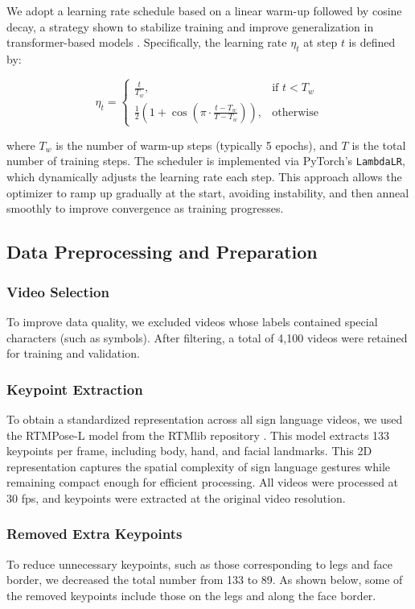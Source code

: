 \documentclass[runningheads]{llncs}
\begin{document}
We adopt a learning rate schedule based on a linear warm-up followed by cosine decay, a strategy shown to stabilize training and improve generalization in transformer-based models \cite{vaswani2023attentionneed, loshchilov2017sgdr}. Specifically, the learning rate \(\eta_t\) at step \(t\) is defined by:

\[
\eta_t = 
\begin{cases}
\frac{t}{T_w}, & \text{if } t < T_w \\
\frac{1}{2} \left(1 + \cos\left( \pi \cdot \frac{t - T_w}{T - T_w} \right) \right), & \text{otherwise}
\end{cases}
\]

where \(T_w\) is the number of warm-up steps (typically 5 epochs), and \(T\) is the total number of training steps. The scheduler is implemented via PyTorch’s \texttt{LambdaLR}, which dynamically adjusts the learning rate each step. This approach allows the optimizer to ramp up gradually at the start, avoiding instability, and then anneal smoothly to improve convergence as training progresses.

\subsection{Data Preprocessing and Preparation}

\subsubsection{Video Selection}
To improve data quality, we excluded videos whose labels contained special characters (such as symbols). After filtering, a total of 4{,}100 videos were retained for training and validation.

\subsubsection{Keypoint Extraction}
To obtain a standardized representation across all sign language videos, we used the RTMPose-L model from the RTMlib repository \cite{rtmlib}. This model extracts 133 keypoints per frame, including body, hand, and facial landmarks. This 2D representation captures the spatial complexity of sign language gestures while remaining compact enough for efficient processing. All videos were processed at 30 fps, and keypoints were extracted at the original video resolution.

\subsubsection{Removed Extra Keypoints}
To reduce unnecessary keypoints, such as those corresponding to legs and face border, we decreased the total number from 133 to 89. As shown below, some of the removed keypoints include those on the legs and along the face border.
\end{document}
